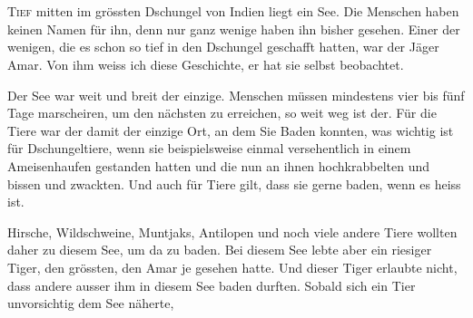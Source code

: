 \chapter*{}
\lettrine[lines=3]{\color{red}T}{ief} mitten im grössten Dschungel von Indien liegt ein See. Die Menschen haben keinen Namen für ihn, denn nur ganz wenige haben ihn bisher gesehen. Einer der wenigen, die es schon so tief in den Dschungel geschafft hatten, war der Jäger Amar. Von ihm weiss ich diese Geschichte, er hat sie selbst beobachtet.

Der See war weit und breit der einzige. Menschen müssen mindestens vier bis fünf Tage marscheiren, um den nächsten zu erreichen, so weit weg ist der. Für die Tiere war der damit der einzige Ort, an 
dem Sie Baden konnten, was wichtig ist für Dschungeltiere, wenn sie beispielsweise einmal versehentlich in einem Ameisenhaufen gestanden hatten und die nun an ihnen hochkrabbelten und bissen und zwackten. Und auch für Tiere gilt, dass sie gerne baden, wenn es heiss ist.

Hirsche, Wildschweine, Muntjaks, Antilopen und noch viele andere Tiere wollten daher zu diesem See, um da zu baden. Bei diesem See lebte aber ein riesiger Tiger, den grössten, den Amar je gesehen hatte. Und dieser Tiger erlaubte nicht, dass andere ausser ihm in diesem See baden durften. Sobald sich ein Tier unvorsichtig dem See näherte, 


 \hfill {\color{red}\decofourleft}
